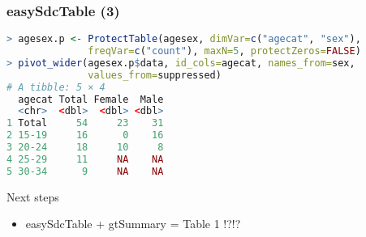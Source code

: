 \documentclass[aspectratio=169,12pt]{beamer} %
\begin{document}
\begin{frame}[fragile]\frametitle{easySdcTable (3)}
\begin{lstlisting}[language=R]
> agesex.p <- ProtectTable(agesex, dimVar=c("agecat", "sex"),
              freqVar=c("count"), maxN=5, protectZeros=FALSE)
> pivot_wider(agesex.p$data, id_cols=agecat, names_from=sex,
              values_from=suppressed)
# A tibble: 5 × 4
  agecat Total Female  Male
  <chr>  <dbl>  <dbl> <dbl>
1 Total     54     23    31
2 15-19     16      0    16
3 20-24     18     10     8
4 25-29     11     NA    NA
5 30-34      9     NA    NA
\end{lstlisting}
\end{frame}

\begin{frame}{Next steps}
	\begin{itemize}
		\item easySdcTable + gtSummary = Table 1 !?!?
	\end{itemize}
\end{frame}
\end{document}
